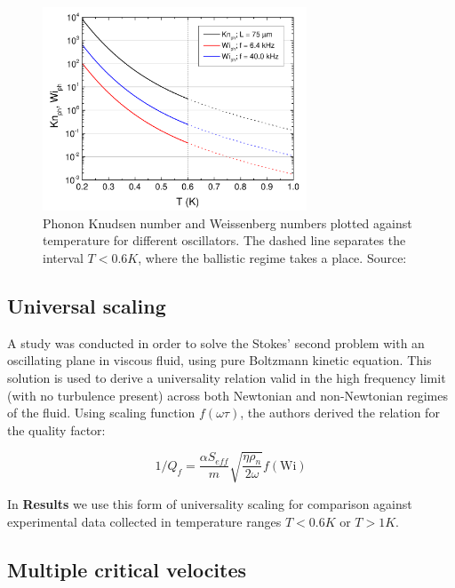 \begin{figure}[h]
	\centering
	\includegraphics[width=0.7\textwidth]{graphics/theory/ballistic}
	\caption{Phonon Knudsen number and Weissenberg numbers plotted against temperature for different oscillators. The dashed line separates the interval $T < 0.6\unit{K}$, where the ballistic regime takes a place. Source: \cite{universal_scaling}}
	\label{ballistic}
\end{figure}

\newpage

\subsection*{Universal scaling}

A study was conducted in order to solve the Stokes' second problem with an oscillating plane in viscous fluid, using pure Boltzmann kinetic equation. This solution is used to derive a universality relation valid in the high frequency limit (with no turbulence present) across both Newtonian and non-Newtonian regimes of the fluid. Using scaling function $f(\omega \tau)$, the authors derived \cite{universal_scaling} the relation for the quality factor:

\begin{equation}
1 / Q_f = \frac{\alpha S_{eff}}{m} \sqrt{\frac{\eta \rho_n}{2\omega}} f(\text{Wi})
\end{equation}

In \textbf{Results} we use this form of universality scaling for comparison against experimental data collected in temperature ranges $T < 0.6\unit{K}$ or $T > 1\unit{K}$.

\subsection*{Multiple critical velocites}

